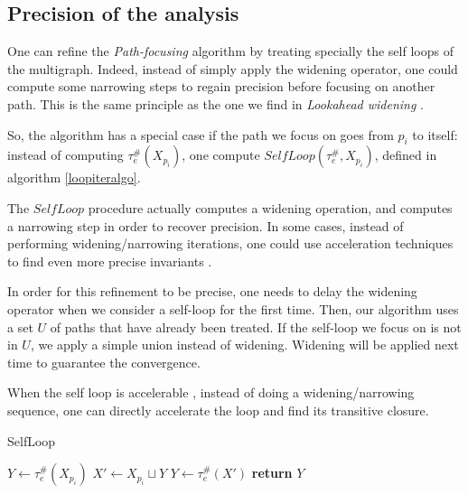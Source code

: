 \documentclass[a4paper,english,titlepage,11pt]{report}
\begin{document}
	\subsection {Precision of the analysis}

	One can refine the \emph{Path-focusing} algorithm by treating specially the
	self loops of the multigraph. Indeed, instead of simply apply the widening
	operator, one could compute some narrowing steps to regain precision before
	focusing on another path. This is the same principle as the one we find in
	\emph{Lookahead widening} \cite{GopanR06}.

	So, the algorithm has a special case if the path we focus on goes from $p_i$
	to itself: instead of computing $\tau_e^\#(X_{p_i})$, one compute
	$SelfLoop(\tau_e^\#,X_{p_i})$, defined in algorithm \ref{loopiteralgo}.

	The $SelfLoop$ procedure actually computes a widening operation, and
	computes a narrowing step in order to recover precision. In some cases,
	instead of performing widening/narrowing iterations, one could use
	acceleration techniques to find even more precise invariants \cite{GH06}.

	In order for this refinement to be precise, one needs to delay the widening
	operator when we consider a self-loop for the first time. Then, our
	algorithm uses a set $U$ of paths that have already been treated. If the
	self-loop we focus on is not in $U$, we apply a simple union instead of
	widening. Widening will be applied next time to guarantee the convergence.

	When the self loop is accelerable \cite{Gon07}, instead of doing a
	widening/narrowing sequence, one can directly accelerate the loop and find
	its transitive closure.

\begin{algorithm}
\caption{SelfLoop}
\label{loopiteralgo}
\begin{algorithmic}[1] 
	\State $Y \gets \tau_e^\#(X_{p_i})$
	\State $X' \gets X_{p_i} \sqcup Y$
	\State $Y \gets \tau_e^\#(X')$
	\State \textbf{return} $Y$
\EndProcedure
\end{algorithmic}
\end{algorithm}
\end{document}
